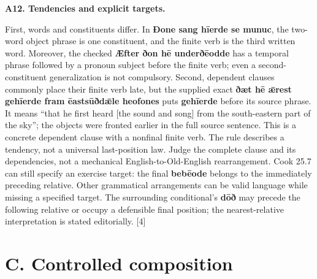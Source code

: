 \par\begin{minipage}{\linewidth}\raggedright
\textbf{A12. Tendencies and explicit targets.}

First, words and constituents differ. In \textbf{Ðone sang hīerde se munuc}, the two-word object phrase is one constituent, and the finite verb is the third written word. Moreover, the checked \textbf{Æfter ðon hē underðēodde} has a temporal phrase followed by a pronoun subject before the finite verb; even a second-constituent generalization is not compulsory. Second, dependent clauses commonly place their finite verb late, but the supplied exact \textbf{ðæt hē ǣrest gehīerde fram ēastsūðdǣle heofones} puts \textbf{gehīerde} before its source phrase. It means “that he first heard [the sound and song] from the south-eastern part of the sky”; the objects were fronted earlier in the full source sentence. This is a concrete dependent clause with a nonfinal finite verb. The rule describes a tendency, not a universal last-position law. Judge the complete clause and its dependencies, not a mechanical English-to-Old-English rearrangement. Cook 25.7 can still specify an exercise target: the final \textbf{bebēode} belongs to the immediately preceding relative. Other grammatical arrangements can be valid language while missing a specified target. The surrounding conditional’s \textbf{dōð} may precede the following relative or occupy a defensible final position; the nearest-relative interpretation is stated editorially. [4]

\end{minipage}\par\addvspace{4pt}

\section*{C. Controlled composition}


